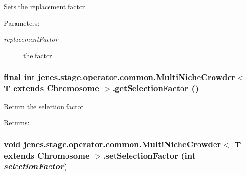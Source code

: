 Sets the replacement factor

\begin{Desc}
\item[Parameters:]
\begin{description}
\item[{\em replacementFactor}]the factor \end{description}
\end{Desc}
\hypertarget{classjenes_1_1stage_1_1operator_1_1common_1_1_multi_niche_crowder_3_01_t_01extends_01_chromosome_01_4_42e85f954b23bdadf63b7aa13365cd40}{
\subsubsection[getSelectionFactor]{\setlength{\rightskip}{0pt plus 5cm}final int jenes.stage.operator.common.MultiNicheCrowder$<$ T extends Chromosome $>$.getSelectionFactor ()}}
\label{classjenes_1_1stage_1_1operator_1_1common_1_1_multi_niche_crowder_3_01_t_01extends_01_chromosome_01_4_42e85f954b23bdadf63b7aa13365cd40}


Return the selection factor

\begin{Desc}
\item[Returns:]\end{Desc}
\hypertarget{classjenes_1_1stage_1_1operator_1_1common_1_1_multi_niche_crowder_3_01_t_01extends_01_chromosome_01_4_0f2ec39933d9656c981f8b7113bbf668}{
\subsubsection[setSelectionFactor]{\setlength{\rightskip}{0pt plus 5cm}void jenes.stage.operator.common.MultiNicheCrowder$<$ T extends Chromosome $>$.setSelectionFactor (int {\em selectionFactor})}}
\label{classjenes_1_1stage_1_1operator_1_1common_1_1_multi_niche_crowder_3_01_t_01extends_01_chromosome_01_4_0f2ec39933d9656c981f8b7113bbf668}


